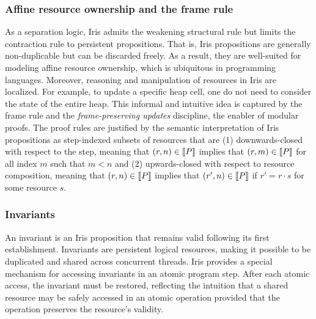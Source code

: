 \documentclass{article}
\theoremstyle{definition}
\theoremstyle{plain}
\theoremstyle{remark}
\begin{document}
\subsubsection{Affine resource ownership and the frame rule}
As a separation logic, Iris admits the weakening structural rule but limits the contraction rule to persistent propositions.
That is, Iris propositions are generally non-duplicable but can be discarded freely.
As a result, they are well-suited for modeling affine resource ownership, which is ubiquitous in programming languages.
Moreover, reasoning and manipulation of resources in Iris are localized.
For example, to update a specific heap cell, one do not need to consider the state of the entire heap.
This informal and intuitive idea is captured by the frame rule and the \emph{frame-preserving updates} discipline, the enabler of modular proofs.
The proof rules are justified by the semantic interpretation of Iris propositions as step-indexed subsets of resources that are
(1) downwards-closed with respect to the step, meaning that \((r,n) \in \llbracket {P} \rrbracket\) implies that \((r,m) \in \llbracket {P} \rrbracket\) for all index \(m\) such that \(m < n\)
and (2) upwards-closed with respect to resource composition, meaning that \((r,n) \in \llbracket {P} \rrbracket\) implies that \((r', n) \in \llbracket {P} \rrbracket\) if \(r' = r \cdot s\) for some resource \(s\).

\subsubsection{Invariants}
An invariant is an Iris proposition that remains valid following its first establishment.
Invariants are persistent logical resources, making it possible to be duplicated and shared across concurrent threads.
Iris provides a special mechanism for accessing invariants in an atomic program step.
After each atomic access, the invariant must be restored, reflecting the intuition that a shared resource may be safely accessed in an atomic operation provided that the operation preserves the resource's validity.
\end{document}
